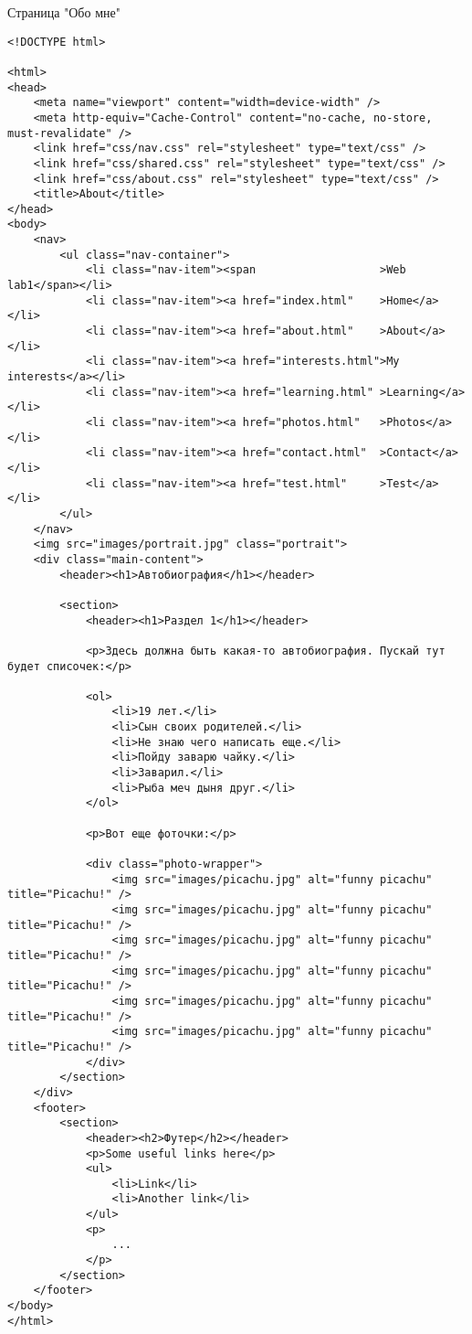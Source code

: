 Страница "Обо мне"
\begin{lstlisting}
<!DOCTYPE html>

<html>
<head>
    <meta name="viewport" content="width=device-width" />
    <meta http-equiv="Cache-Control" content="no-cache, no-store, must-revalidate" />
    <link href="css/nav.css" rel="stylesheet" type="text/css" />
    <link href="css/shared.css" rel="stylesheet" type="text/css" />
    <link href="css/about.css" rel="stylesheet" type="text/css" />
    <title>About</title>
</head>
<body>
    <nav>
        <ul class="nav-container">
            <li class="nav-item"><span                   >Web lab1</span></li>
            <li class="nav-item"><a href="index.html"    >Home</a></li>
            <li class="nav-item"><a href="about.html"    >About</a></li>
            <li class="nav-item"><a href="interests.html">My interests</a></li>
            <li class="nav-item"><a href="learning.html" >Learning</a></li>
            <li class="nav-item"><a href="photos.html"   >Photos</a></li>
            <li class="nav-item"><a href="contact.html"  >Contact</a></li>
            <li class="nav-item"><a href="test.html"     >Test</a></li>
        </ul>
    </nav>
    <img src="images/portrait.jpg" class="portrait">
    <div class="main-content">
        <header><h1>Автобиография</h1></header>

        <section>
            <header><h1>Раздел 1</h1></header>

            <p>Здесь должна быть какая-то автобиография. Пускай тут будет списочек:</p>

            <ol>
                <li>19 лет.</li>
                <li>Сын своих родителей.</li>
                <li>Не знаю чего написать еще.</li>
                <li>Пойду заварю чайку.</li>
                <li>Заварил.</li>
                <li>Рыба меч дыня друг.</li>
            </ol>

            <p>Вот еще фоточки:</p>

            <div class="photo-wrapper">
                <img src="images/picachu.jpg" alt="funny picachu" title="Picachu!" />
                <img src="images/picachu.jpg" alt="funny picachu" title="Picachu!" />
                <img src="images/picachu.jpg" alt="funny picachu" title="Picachu!" />
                <img src="images/picachu.jpg" alt="funny picachu" title="Picachu!" />
                <img src="images/picachu.jpg" alt="funny picachu" title="Picachu!" />
                <img src="images/picachu.jpg" alt="funny picachu" title="Picachu!" />
            </div>
        </section>
    </div>
    <footer>
        <section>
            <header><h2>Футер</h2></header>
            <p>Some useful links here</p>
            <ul>
                <li>Link</li>
                <li>Another link</li>
            </ul>
            <p>
                ...
            </p>
        </section>
    </footer>
</body>
</html>
\end{lstlisting}

